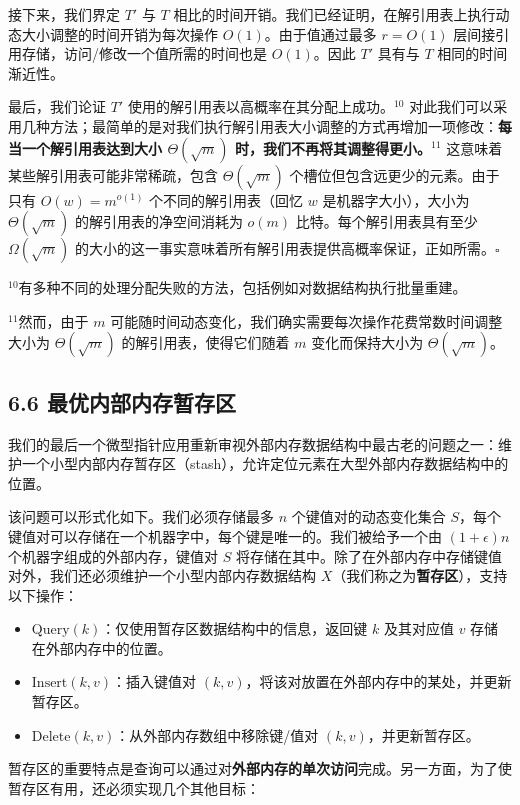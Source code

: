 \documentclass[12pt,a4paper]{ctexart}
\theoremstyle{remark}
\begin{document}
接下来，我们界定 $T'$ 与 $T$ 相比的时间开销。我们已经证明，在解引用表上执行动态大小调整的时间开销为每次操作 $O(1)$。由于值通过最多 $r=O(1)$ 层间接引用存储，访问/修改一个值所需的时间也是 $O(1)$。因此 $T'$ 具有与 $T$ 相同的时间渐近性。

最后，我们论证 $T'$ 使用的解引用表以高概率在其分配上成功。$^{10}$ 对此我们可以采用几种方法；最简单的是对我们执行解引用表大小调整的方式再增加一项修改：\textbf{每当一个解引用表达到大小 $\Theta(\sqrt{m})$ 时，我们不再将其调整得更小。}$^{11}$ 这意味着某些解引用表可能非常稀疏，包含 $\Theta(\sqrt{m})$ 个槽位但包含远更少的元素。由于只有 $O(w)=m^{o(1)}$ 个不同的解引用表（回忆 $w$ 是机器字大小），大小为 $\Theta(\sqrt{m})$ 的解引用表的净空间消耗为 $o(m)$ 比特。每个解引用表具有至少 $\Omega(\sqrt{m})$ 的大小的这一事实意味着所有解引用表提供高概率保证，正如所需。$\square$

$^{10}$有多种不同的处理分配失败的方法，包括例如对数据结构执行批量重建。

$^{11}$然而，由于 $m$ 可能随时间动态变化，我们确实需要每次操作花费常数时间调整大小为 $\Theta(\sqrt{m})$ 的解引用表，使得它们随着 $m$ 变化而保持大小为 $\Theta(\sqrt{m})$。

\subsection{6.6 最优内部内存暂存区}
我们的最后一个微型指针应用重新审视外部内存数据结构中最古老的问题之一：维护一个小型内部内存暂存区（stash），允许定位元素在大型外部内存数据结构中的位置。

该问题可以形式化如下。我们必须存储最多 $n$ 个键值对的动态变化集合 $S$，每个键值对可以存储在一个机器字中，每个键是唯一的。我们被给予一个由 $(1+\epsilon)n$ 个机器字组成的外部内存，键值对 $S$ 将存储在其中。除了在外部内存中存储键值对外，我们还必须维护一个小型内部内存数据结构 $X$（我们称之为\textbf{暂存区}），支持以下操作：

\begin{itemize}
\item $\text{Query}(k)$：仅使用暂存区数据结构中的信息，返回键 $k$ 及其对应值 $v$ 存储在外部内存中的位置。
\item $\text{Insert}(k,v)$：插入键值对 $(k,v)$，将该对放置在外部内存中的某处，并更新暂存区。
\item $\text{Delete}(k,v)$：从外部内存数组中移除键/值对 $(k,v)$，并更新暂存区。
\end{itemize}

暂存区的重要特点是查询可以通过对\textbf{外部内存的单次访问}完成。另一方面，为了使暂存区有用，还必须实现几个其他目标：
\end{document}
